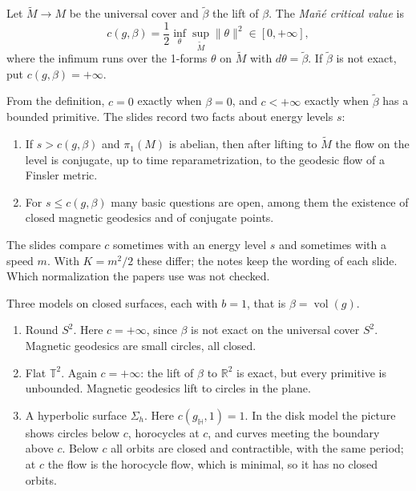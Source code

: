 Let $\widetilde{M} \to M$ be the universal
cover and $\widetilde\beta$ the lift of
$\beta$. The \emph{Mañé critical value} is
\begin{equation}
\label{equation-mane-critical-value}
c(g,\beta) = \frac{1}{2}
\inf_{\theta}
\sup_{\widetilde{M}}
\|\theta\|^2
\in [0,+\infty],
\end{equation}
where the infimum runs over the 1-forms
$\theta$ on $\widetilde{M}$ with
$d\theta = \widetilde\beta$. If
$\widetilde\beta$ is not exact, put
$c(g,\beta) = +\infty$.

From the definition, $c = 0$ exactly when
$\beta = 0$, and $c < +\infty$ exactly when
$\widetilde\beta$ has a bounded primitive.
The slides record two facts about energy
levels $s$:
\begin{enumerate}
\item If $s > c(g,\beta)$ and
$\pi_1(M)$ is abelian, then after lifting to
$\widetilde{M}$ the flow on the level is
conjugate, up to time reparametrization, to
the geodesic flow of a Finsler metric.
\item For $s \le c(g,\beta)$ many basic
questions are open, among them the
existence of closed magnetic geodesics and
of conjugate points.
\end{enumerate}

\begin{remark}
\label{remark-speed-energy-mane}
The slides compare $c$ sometimes with an
energy level $s$ and sometimes with a speed
$m$. With $K = m^2/2$ these differ; the
notes keep the wording of each slide. Which
normalization the papers use was not
checked.
\end{remark}

\begin{example}
\label{example-mane-standard-models}
Three models on closed surfaces, each with
$b = 1$, that is $\beta = \operatorname{vol}
(g)$.
\begin{enumerate}
\item Round $S^2$. Here $c = +\infty$,
since $\beta$ is not exact on the universal
cover $S^2$. Magnetic geodesics are small
circles, all closed.
\item Flat $\mathbb{T}^2$. Again $c =
+\infty$: the lift of $\beta$ to
$\mathbb{R}^2$ is exact, but every primitive
is unbounded. Magnetic geodesics lift to
circles in the plane.
\item A hyperbolic surface $\Sigma_h$. Here
$c(g_{\mathbb{H}},1) = 1$. In the disk
model the picture shows circles below $c$,
horocycles at $c$, and curves meeting the
boundary above $c$. Below $c$ all
orbits are closed and contractible, with
the same period; at $c$ the flow is the
horocycle flow, which is minimal, so it has
no closed orbits.
\end{enumerate}
\end{example}

